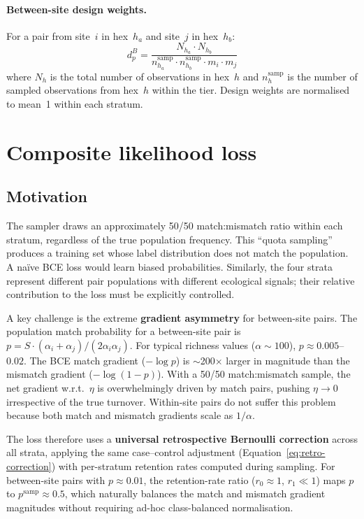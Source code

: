 \documentclass{article}
\begin{document}
\paragraph{Between-site design weights.} For a pair from site~$i$ in hex~$h_a$ and site~$j$ in hex~$h_b$:
\begin{equation}
    d_p^B = \frac{N_{h_a} \cdot N_{h_b}}{n_{h_a}^{\text{samp}} \cdot n_{h_b}^{\text{samp}} \cdot m_i \cdot m_j}
\end{equation}
where $N_h$ is the total number of observations in hex~$h$ and $n_h^{\text{samp}}$ is the number of sampled observations from hex~$h$ within the tier. Design weights are normalised to mean~1 within each stratum.

\section{Composite likelihood loss}
\label{sec:composite-loss}

\subsection{Motivation}

The sampler draws an approximately 50/50 match:mismatch ratio within each stratum, regardless of the true population frequency. This ``quota sampling'' produces a training set whose label distribution does not match the population. A na\"ive BCE loss would learn biased probabilities. Similarly, the four strata represent different pair populations with different ecological signals; their relative contribution to the loss must be explicitly controlled.

A key challenge is the extreme \textbf{gradient asymmetry} for between-site pairs. The population match probability for a between-site pair is $p = S \cdot (\alpha_i + \alpha_j) / (2\alpha_i\alpha_j)$. For typical richness values ($\alpha \sim 100$), $p \approx 0.005$--$0.02$. The BCE match gradient ($-\log p$) is $\sim$200$\times$ larger in magnitude than the mismatch gradient ($-\log(1 - p)$). With a 50/50 match:mismatch sample, the net gradient w.r.t.\ $\eta$ is overwhelmingly driven by match pairs, pushing $\eta \to 0$ irrespective of the true turnover. Within-site pairs do not suffer this problem because both match and mismatch gradients scale as $1/\alpha$.

The loss therefore uses a \textbf{universal retrospective Bernoulli correction} across all strata, applying the same case--control adjustment (Equation~\ref{eq:retro-correction}) with per-stratum retention rates computed during sampling. For between-site pairs with $p \approx 0.01$, the retention-rate ratio ($r_0 \approx 1$, $r_1 \ll 1$) maps $p$ to $p^{\text{samp}} \approx 0.5$, which naturally balances the match and mismatch gradient magnitudes without requiring ad-hoc class-balanced normalisation.
\end{document}
